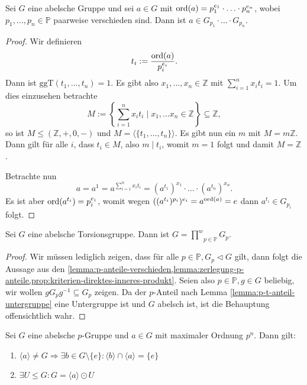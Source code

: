 \begin{lemma} \label{lemma:zerlegung-p-anteile}
    Sei $G$ eine abelsche Gruppe und sei $a \in G$ mit $\operatorname{ord}(a) = p_1^{e_1} \cdot \hdots \cdot p_n^{e_n}$, wobei $p_1, \hdots, p_n \in \mathbb{P}$ paarweise verschieden sind. Dann ist $a \in G_{p_1} \cdot \hdots \cdot G_{p_n}$.
\end{lemma}

\begin{proof}
    Wir definieren
    $$ t_i := \frac{\operatorname{ord}(a)}{p_i^{e_i}}. $$
    Dann ist $\mathrm{ggT}(t_1, \hdots, t_n) = 1$. Es gibt also $x_1, \hdots, x_n \in \mathbb{Z}$ mit $\sum_{i=1}^n x_i t_i = 1$. Um dies einzusehen betrachte
    $$ M := \left\{ \sum_{i=1}^n x_i t_i \mid x_1, \hdots x_n \in \mathbb{Z} \right\} \subseteq \mathbb{Z}, $$
    so ist $M \leq (\mathbb{Z}, +, 0, -)$ und $M = \langle \{ t_1, \hdots, t_n \} \rangle$. Es gibt nun ein $m$ mit $M = m \mathbb{Z}$. Dann gilt für alle $i$, dass $t_i \in M$, also $m \mid t_i$, womit $m = 1$ folgt und damit $M = \mathbb{Z}$.

    Betrachte nun
    $$ a = a^1 = a^{\sum_{i=1}^n x_i t_i} = (a^{t_1})^{x_1} \cdot \hdots \cdot (a^{t_n})^{x_n}. $$
    Es ist aber $\operatorname{ord}(a^{t_i}) = p_i^{e_i}$, womit wegen $((a^{t_i})^{p_i})^{e_i} = a^{\operatorname{ord}(a)} = e$ dann $a^{t_i} \in G_{p_i}$ folgt.
\end{proof}


\begin{theorem}
    Sei $G$ eine abelsche Torsionsgruppe. Dann ist $G = \stackrel{w}{\prod}_{p \in \mathbb{P}} G_p$.
\end{theorem}

\begin{proof}
    Wir müssen lediglich zeigen, dass für alle $p \in \mathbb{P}, G_p \vartriangleleft G$ gilt,
    dann folgt die Aussage aus den \cref{lemma:p-anteile-verschieden,lemma:zerlegung-p-anteile,prop:kriterien-direktes-inneres-produkt}. Seien also $p \in \mathbb{P}, g \in G$ beliebig, wir wollen $g G_p g^{-1} \subseteq G_p$ zeigen.
    Da der $p$-Anteil nach Lemma \ref{lemma:p-t-anteil-untergruppe} eine Untergruppe ist und $G$ abelsch ist, ist die Behauptung offensichtlich wahr.
\end{proof}

\begin{lemma}\label{lemma:p-gruppe-max-ordnung}
    Sei $G$ eine abelsche $p$-Gruppe und $a \in G$ mit maximaler Ordnung $p^n$. Dann gilt:
    \begin{enumerate}
        \item $\langle a \rangle \neq G \Rightarrow \exists b \in G \setminus \{ e \} : \langle b \rangle \cap \langle a \rangle = \{ e \}$\label{item:lemma:p-gruppe-max-ordnung:1}
        \item $\exists U \leq G: G = \langle a \rangle \odot U$
    \end{enumerate}
\end{lemma}

